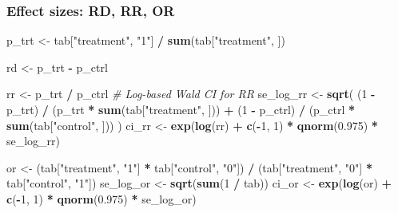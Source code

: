 \documentclass[
]{article}
\newenvironment{Shaded}{\begin{snugshade}}{\end{snugshade}}
\newcommand{\CommentTok}[1]{\textcolor[rgb]{0.56,0.35,0.01}{\textit{#1}}}
\newcommand{\DecValTok}[1]{\textcolor[rgb]{0.00,0.00,0.81}{#1}}
\newcommand{\FloatTok}[1]{\textcolor[rgb]{0.00,0.00,0.81}{#1}}
\newcommand{\FunctionTok}[1]{\textcolor[rgb]{0.13,0.29,0.53}{\textbf{#1}}}
\newcommand{\NormalTok}[1]{#1}
\newcommand{\OtherTok}[1]{\textcolor[rgb]{0.56,0.35,0.01}{#1}}
\newcommand{\SpecialCharTok}[1]{\textcolor[rgb]{0.81,0.36,0.00}{\textbf{#1}}}
\newcommand{\StringTok}[1]{\textcolor[rgb]{0.31,0.60,0.02}{#1}}
\begin{document}
\subsubsection{Effect sizes: RD, RR, OR}\label{effect-sizes-rd-rr-or}

\begin{Shaded}
\begin{Highlighting}[]
\NormalTok{p\_trt  }\OtherTok{\textless{}{-}}\NormalTok{ tab[}\StringTok{"treatment"}\NormalTok{, }\StringTok{"1"}\NormalTok{] }\SpecialCharTok{/} \FunctionTok{sum}\NormalTok{(tab[}\StringTok{"treatment"}\NormalTok{, ])}

\NormalTok{rd }\OtherTok{\textless{}{-}}\NormalTok{ p\_trt }\SpecialCharTok{{-}}\NormalTok{ p\_ctrl}

\NormalTok{rr }\OtherTok{\textless{}{-}}\NormalTok{ p\_trt }\SpecialCharTok{/}\NormalTok{ p\_ctrl}
\CommentTok{\# Log{-}based Wald CI for RR}
\NormalTok{se\_log\_rr }\OtherTok{\textless{}{-}} \FunctionTok{sqrt}\NormalTok{(}
\NormalTok{  (}\DecValTok{1} \SpecialCharTok{{-}}\NormalTok{ p\_trt)  }\SpecialCharTok{/}\NormalTok{ (p\_trt  }\SpecialCharTok{*} \FunctionTok{sum}\NormalTok{(tab[}\StringTok{"treatment"}\NormalTok{, ])) }\SpecialCharTok{+}
\NormalTok{  (}\DecValTok{1} \SpecialCharTok{{-}}\NormalTok{ p\_ctrl) }\SpecialCharTok{/}\NormalTok{ (p\_ctrl }\SpecialCharTok{*} \FunctionTok{sum}\NormalTok{(tab[}\StringTok{"control"}\NormalTok{,   ]))}
\NormalTok{)}
\NormalTok{ci\_rr }\OtherTok{\textless{}{-}} \FunctionTok{exp}\NormalTok{(}\FunctionTok{log}\NormalTok{(rr) }\SpecialCharTok{+} \FunctionTok{c}\NormalTok{(}\SpecialCharTok{{-}}\DecValTok{1}\NormalTok{, }\DecValTok{1}\NormalTok{) }\SpecialCharTok{*} \FunctionTok{qnorm}\NormalTok{(}\FloatTok{0.975}\NormalTok{) }\SpecialCharTok{*}\NormalTok{ se\_log\_rr)}

\NormalTok{or }\OtherTok{\textless{}{-}}\NormalTok{ (tab[}\StringTok{"treatment"}\NormalTok{, }\StringTok{"1"}\NormalTok{] }\SpecialCharTok{*}\NormalTok{ tab[}\StringTok{"control"}\NormalTok{, }\StringTok{"0"}\NormalTok{]) }\SpecialCharTok{/}
\NormalTok{      (tab[}\StringTok{"treatment"}\NormalTok{, }\StringTok{"0"}\NormalTok{] }\SpecialCharTok{*}\NormalTok{ tab[}\StringTok{"control"}\NormalTok{, }\StringTok{"1"}\NormalTok{])}
\NormalTok{se\_log\_or }\OtherTok{\textless{}{-}} \FunctionTok{sqrt}\NormalTok{(}\FunctionTok{sum}\NormalTok{(}\DecValTok{1} \SpecialCharTok{/}\NormalTok{ tab))}
\NormalTok{ci\_or }\OtherTok{\textless{}{-}} \FunctionTok{exp}\NormalTok{(}\FunctionTok{log}\NormalTok{(or) }\SpecialCharTok{+} \FunctionTok{c}\NormalTok{(}\SpecialCharTok{{-}}\DecValTok{1}\NormalTok{, }\DecValTok{1}\NormalTok{) }\SpecialCharTok{*} \FunctionTok{qnorm}\NormalTok{(}\FloatTok{0.975}\NormalTok{) }\SpecialCharTok{*}\NormalTok{ se\_log\_or)}


\end{Highlighting}
\end{Shaded}
\end{document}
